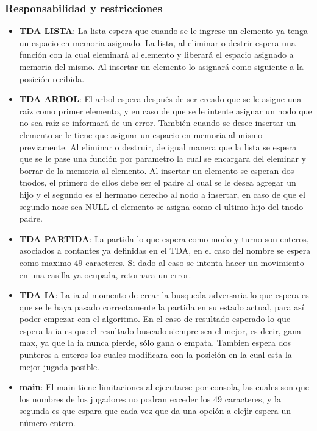 \documentclass[12pt,twocolum,a4paper]{article}
\begin{document}
\subsubsection{Responsabilidad y restricciones}
\begin{itemize}
    \item {\bf TDA LISTA}: La lista espera que cuando se le ingrese un elemento ya tenga un espacio en memoria asignado. La lista, al eliminar o destrir espera una funci\'on con la cual eleminar\'a al elemento y liberar\'a el espacio asignado a memoria del mismo. Al insertar un elemento lo asignar\'a como siguiente a la posici\'on recibida.
    \item {\bf TDA ARBOL}: El arbol espera despu\'es de ser creado que se le asigne una raiz como primer elemento, y en caso de que se le intente asignar un nodo que no sea ra\'iz se informar\'a de un error. Tambi\'en cuando se desee insertar un elemento se le tiene que asignar un espacio en memoria al mismo previamente. Al eliminar o destruir, de igual manera que la lista se espera que se le pase una funci\'on por parametro la cual se encargara del eleminar y borrar de la memoria al elemento. Al insertar un elemento se esperan dos tnodos, el primero de ellos debe ser el padre al cual se le desea agregar un hijo y el segundo es el hermano derecho al nodo a insertar, en caso de que el segundo nose sea NULL el elemento se asigna como el ultimo hijo del tnodo padre.
    \item {\bf TDA PARTIDA}: La partida lo que espera como modo y turno son enteros, asociados a contantes ya definidas en el TDA, en el caso del nombre se espera como maximo 49 caracteres. Si dado al caso se intenta hacer un movimiento en una casilla ya ocupada, retornara un error.
    \item {\bf TDA IA}: La ia al momento de crear la busqueda adversaria lo que espera es que se le haya pasado correctamente la partida en su estado actual, para as\'i poder empezar con el algoritmo. En el caso de resultado esperado lo que espera la ia es que el resultado buscado siempre sea el mejor, es decir, gana max, ya que la ia nunca pierde, s\'olo gana o empata. Tambien espera dos punteros a enteros los cuales modificara con la posici\'on en la cual esta la mejor jugada posible.
    \item {\bf main}: El main tiene limitaciones al ejecutarse por consola, las cuales son que los nombres de los jugadores no podran exceder los 49 caracteres, y la segunda es que espara que cada vez que da una opci\'on a elejir espera un n\'umero entero.
\end{itemize}
\end{document}
